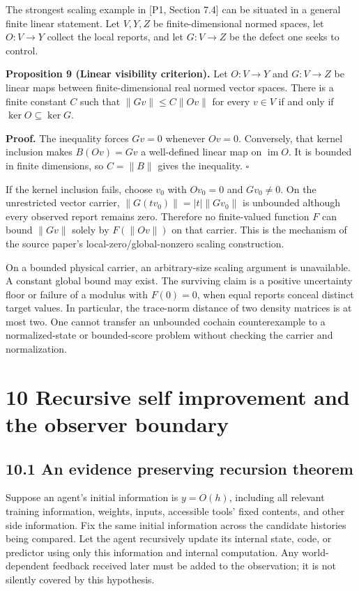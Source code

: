 \documentclass[
]{article}
\begin{document}
The strongest scaling example in {[}P1, Section 7.4{]} can be situated in a general finite linear statement. Let \(V,Y,Z\) be finite-dimensional normed spaces, let \(O:V\to Y\) collect the local reports, and let \(G:V\to Z\) be the defect one seeks to control.

\textbf{Proposition 9 (Linear visibility criterion).} Let \(O:V\to Y\) and \(G:V\to Z\) be linear maps between finite-dimensional real normed vector spaces. There is a finite constant \(C\) such that \(\|Gv\|\le C\|Ov\|\) for every \(v\in V\) if and only if \(\ker O\subseteq\ker G\).

\textbf{Proof.} The inequality forces \(Gv=0\) whenever \(Ov=0\). Conversely, that kernel inclusion makes \(B(Ov)=Gv\) a well-defined linear map on \(\operatorname{im}O\). It is bounded in finite dimensions, so \(C=\|B\|\) gives the inequality. \(\square\)

If the kernel inclusion fails, choose \(v_0\) with \(Ov_0=0\) and \(Gv_0\ne0\). On the unrestricted vector carrier, \(\|G(tv_0)\|=|t|\|Gv_0\|\) is unbounded although every observed report remains zero. Therefore no finite-valued function \(F\) can bound \(\|Gv\|\) solely by \(F(\|Ov\|)\) on that carrier. This is the mechanism of the source paper's local-zero/global-nonzero scaling construction.

On a bounded physical carrier, an arbitrary-size scaling argument is unavailable. A constant global bound may exist. The surviving claim is a positive uncertainty floor or failure of a modulus with \(F(0)=0\), when equal reports conceal distinct target values. In particular, the trace-norm distance of two density matrices is at most two. One cannot transfer an unbounded cochain counterexample to a normalized-state or bounded-score problem without checking the carrier and normalization.

\section{10 Recursive self improvement and the observer boundary}\label{recursive-self-improvement-and-the-observer-boundary}

\subsection{10.1 An evidence preserving recursion theorem}\label{an-evidence-preserving-recursion-theorem}

Suppose an agent's initial information is \(y=O(h)\), including all relevant training information, weights, inputs, accessible tools' fixed contents, and other side information. Fix the same initial information across the candidate histories being compared. Let the agent recursively update its internal state, code, or predictor using only this information and internal computation. Any world-dependent feedback received later must be added to the observation; it is not silently covered by this hypothesis.
\end{document}
